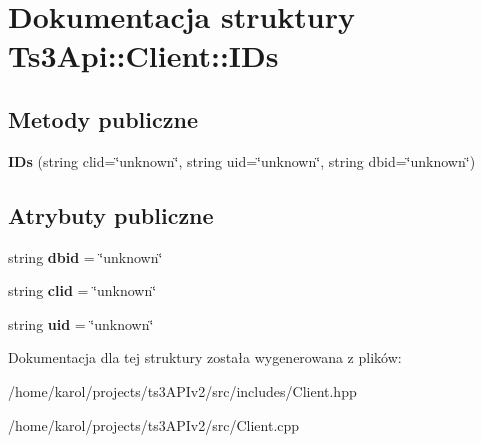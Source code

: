 \hypertarget{struct_ts3_api_1_1_client_1_1_i_ds}{}\section{Dokumentacja struktury Ts3\+Api\+:\+:Client\+:\+:I\+Ds}
\label{struct_ts3_api_1_1_client_1_1_i_ds}
\subsection*{Metody publiczne}
\begin{DoxyCompactItemize}
\item 
{\bfseries I\+Ds} (string clid=\char`\"{}unknown\char`\"{}, string uid=\char`\"{}unknown\char`\"{}, string dbid=\char`\"{}unknown\char`\"{})\hypertarget{struct_ts3_api_1_1_client_1_1_i_ds_a09b63cd33e2cda211b9602331fcbc479}{}\label{struct_ts3_api_1_1_client_1_1_i_ds_a09b63cd33e2cda211b9602331fcbc479}

\end{DoxyCompactItemize}
\subsection*{Atrybuty publiczne}
\begin{DoxyCompactItemize}
\item 
string {\bfseries dbid} = \char`\"{}unknown\char`\"{}\hypertarget{struct_ts3_api_1_1_client_1_1_i_ds_a24bc7b82dce19a9aedbc44cd3962da29}{}\label{struct_ts3_api_1_1_client_1_1_i_ds_a24bc7b82dce19a9aedbc44cd3962da29}

\item 
string {\bfseries clid} = \char`\"{}unknown\char`\"{}\hypertarget{struct_ts3_api_1_1_client_1_1_i_ds_a9629faff180a32d054f11316a5accd0d}{}\label{struct_ts3_api_1_1_client_1_1_i_ds_a9629faff180a32d054f11316a5accd0d}

\item 
string {\bfseries uid} = \char`\"{}unknown\char`\"{}\hypertarget{struct_ts3_api_1_1_client_1_1_i_ds_aea719a541ce3791f6753e3acf25b9b64}{}\label{struct_ts3_api_1_1_client_1_1_i_ds_aea719a541ce3791f6753e3acf25b9b64}

\end{DoxyCompactItemize}


Dokumentacja dla tej struktury została wygenerowana z plików\+:\begin{DoxyCompactItemize}
\item 
/home/karol/projects/ts3\+A\+P\+Iv2/src/includes/Client.\+hpp\item 
/home/karol/projects/ts3\+A\+P\+Iv2/src/Client.\+cpp\end{DoxyCompactItemize}

